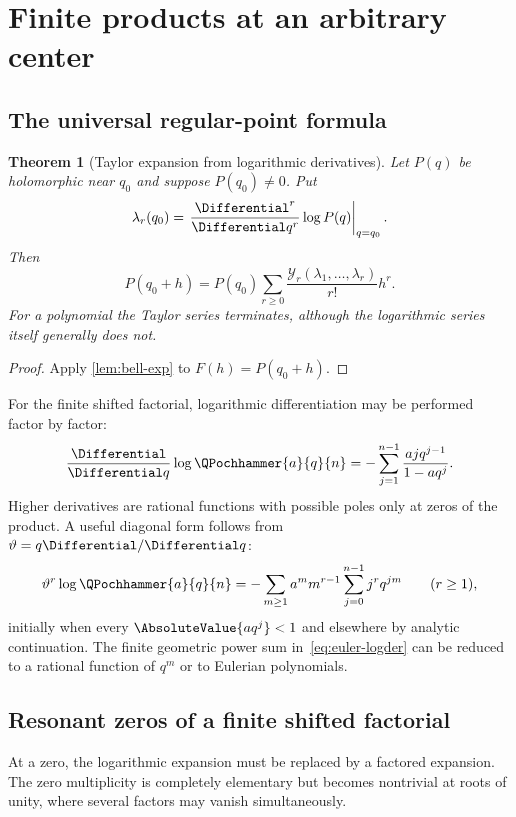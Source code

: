 \documentclass[11pt,oneside]{article}
\newtheorem{theorem}{Theorem}[section]
\theoremstyle{definition}
\theoremstyle{remark}
\newcommand{\Bell}{\mathcal Y}
\newcommand{\Thetaop}{\vartheta}
\let\reporttopsection\section
\let\reportsubsection\subsection
\let\chapter\reporttopsection
\let\section\reportsubsection
\begin{document}
\chapter{Finite products at an arbitrary center}\label{chap:regular-center}

\section{The universal regular-point formula}

\begin{theorem}[Taylor expansion from logarithmic derivatives]\label{thm:regular-bell}
Let $P(q)$ be holomorphic near $q_0$ and suppose $P(q_0)\ne0$.  Put
\[
 \lambda_r(q_0)=
 \left.\frac{\Differential^r}{\Differential q^r}\log P(q)\right|_{q=q_0}.
\]
Then
\[
 P(q_0+h)=P(q_0)
 \sum_{r\ge0}\frac{\Bell_r(\lambda_1,\ldots,\lambda_r)}{r!}h^r.
\]
For a polynomial the Taylor series terminates, although the logarithmic series
itself generally does not.
\end{theorem}

\begin{proof}
Apply \cref{lem:bell-exp} to $F(h)=P(q_0+h)$.
\end{proof}

For the finite shifted factorial, logarithmic differentiation may be performed
factor by factor:
\begin{equation}\label{eq:finite-poc-logder}
 \frac{\Differential}{\Differential q}\log\QPochhammer{a}{q}{n}
 =-\sum_{j=1}^{n-1}\frac{ajq^{j-1}}{1-aq^j}.
\end{equation}
Higher derivatives are rational functions with possible poles only at zeros of
the product.  A useful diagonal form follows from $\Thetaop=q\Differential/\Differential q$:
\begin{equation}\label{eq:euler-logder}
 \Thetaop^r\log\QPochhammer{a}{q}{n}
 =-\sum_{m\ge1}a^m m^{r-1}
   \sum_{j=0}^{n-1}j^r q^{jm}
 \qquad(r\ge1),
\end{equation}
initially when every $\AbsoluteValue{aq^j}<1$ and elsewhere by analytic continuation.
The finite geometric power sum in~\eqref{eq:euler-logder} can be reduced to a
rational function of $q^m$ or to Eulerian polynomials.

\section{Resonant zeros of a finite shifted factorial}

At a zero, the logarithmic expansion must be replaced by a factored expansion.
The zero multiplicity is completely elementary but becomes nontrivial at roots
of unity, where several factors may vanish simultaneously.
\end{document}
